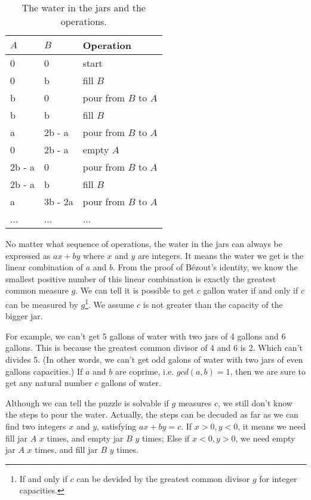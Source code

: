 \documentclass{article}
\begin{document}
\begin{table}[htbp]
\centering
\begin{tabular}{l|l|l}
$A$ & $B$ & Operation \\
\hline
0 & 0 & start \\
0 & b & fill $B$ \\
b & 0 & pour from $B$ to $A$ \\
b & b & fill $B$ \\
a & 2b - a & pour from $B$ to $A$ \\
0 & 2b - a & empty $A$ \\
2b - a & 0 & pour from $B$ to $A$ \\
2b - a & b & fill $B$ \\
a & 3b - 2a & pour from $B$ to $A$ \\
... & ... & ... \\
\end{tabular}
\caption{The water in the jars and the operations.} \label{tab:jug-ops}
\end{table}

No matter what sequence of operations, the water in the jars can always be expressed as $ax + by$ where $x$ and $y$ are integers. It means the water we get is the linear combination of $a$ and $b$. From the proof of Bézout's identity, we know the smallest positive number of this linear combination is exactly the greatest common measure $g$. We can tell it is possible to get $c$ gallon water if and only if $c$ can be measured by $g$\footnote{If and only if $c$ can be devided by the greatest common divisor $g$ for integer capacities.}. We assume $c$ is not greater than the capacity of the bigger jar.

For example, we can't get 5 gallons of water with two jars of 4 gallons and 6 gallons. This is because the greatest common divisor of 4 and 6 is 2. Which can't divides 5. (In other words, we can't get odd galons of water with two jars of even gallons capacities.) If $a$ and $b$ are coprime, i.e. $gcd(a, b) = 1$, then we are sure to get any natural number $c$ gallons of water.

Although we can tell the puzzle is solvable if $g$ measures $c$, we still don't know the steps to pour the water. Actually, the steps can be decuded as far as we can find two integers $x$ and $y$, satisfying $ax + by = c$. If $x > 0, y < 0$, it means we need fill jar $A$ $x$ times, and empty jar $B$ $y$ times; Else if $x < 0, y > 0$, we need empty jar $A$ $x$ times, and fill jar $B$ $y$ times.
\end{document}
